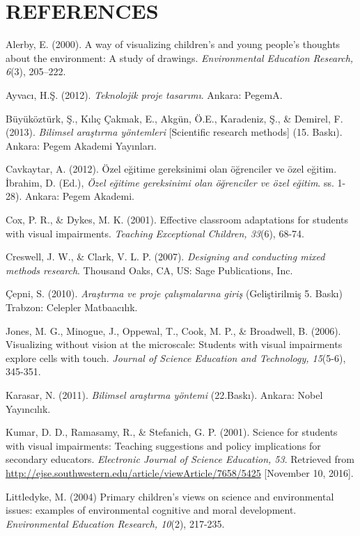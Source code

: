 \documentclass[11.5pt]{sig-alternate} %
\begin{document}
\section*{REFERENCES}\par 

\leftskip 0.25in
\parindent -0.25in 

Alerby, E. (2000). A way of visualizing children’s and young people’s thoughts about the environment: A study of drawings. \textit{Environmental Education Research, 6}(3), 205–222.

Ayvacı, H.Ş. (2012). \textit{Teknolojik proje tasarımı}. Ankara: PegemA.

Büyüköztürk, Ş., Kılıç Çakmak, E., Akgün, Ö.E., Karadeniz, Ş., \& Demirel, F. (2013). 	\textit{Bilimsel araştırma yöntemleri} [Scientific research methods] (15. Baskı). Ankara: Pegem Akademi Yayınları.

Cavkaytar, A. (2012). Özel eğitime gereksinimi olan öğrenciler ve özel eğitim. İbrahim, D. (Ed.), \textit{Özel eğitime gereksinimi olan öğrenciler ve özel eğitim}. ss. 1-28). Ankara: Pegem Akademi.

Cox, P. R., \& Dykes, M. K. (2001). Effective classroom adaptations for students with visual impairments. \textit{Teaching Exceptional Children, 33}(6), 68-74.

Creswell, J. W., \& Clark, V. L. P. (2007). \textit{Designing and conducting mixed methods research}. Thousand Oaks, CA, US: Sage Publications, Inc.

Çepni, S. (2010). \textit{Araştırma ve proje çalışmalarına giriş} (Geliştirilmiş 5. Baskı) Trabzon: Celepler Matbaacılık.

Jones, M. G., Minogue, J., Oppewal, T., Cook, M. P., \& Broadwell, B. (2006). Visualizing without vision at the microscale: Students with visual impairments explore cells with touch. \textit{Journal of Science Education and Technology, 15}(5-6), 345-351.

Karasar, N. (2011). \textit{Bilimsel araştırma yöntemi} (22.Baskı). Ankara: Nobel Yayıncılık. 

Kumar, D. D., Ramasamy, R., \& Stefanich, G. P. (2001). Science for students with visual impairments: Teaching suggestions and policy implications for secondary educators. \textit{Electronic Journal of Science Education, 53}. Retrieved from \url{http://ejse.southwestern.edu/article/viewArticle/7658/5425} [November 10, 2016]. 

Littledyke, M. (2004) Primary children’s views on science and environmental issues: examples of environmental cognitive and moral development. \textit{Environmental Education Research, 10}(2), 217-235.
\end{document}
